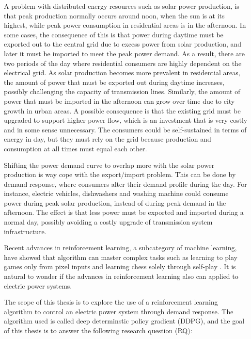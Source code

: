 \documentclass[class=book, crop=false]{standalone}
\begin{document}
A problem with distributed energy resources such as solar power production, is that peak production  normally occurs around noon, when the sun is at its highest, while peak power consumption in residential areas is in the afternoon. In some cases, the consequence of this is that power during daytime must be exported out to the central grid due to excess power from solar production, and later it must be imported to meet the peak power demand. As a result, there are two periods of the day where residential consumers are highly dependent on the electrical grid. As solar production becomes more prevalent in residential areas, the amount of power that must be exported out during daytime increases, possibly challenging the capacity of transmission lines. Similarly, the amount of power that must be imported in the afternoon can grow over time due to city growth in urban areas. A possible consequence is that the existing grid must be upgraded to support higher power flow, which is an investment that is very costly and in some sense unnecessary. The consumers could be self-sustained in terms of energy in day, but they must rely on the grid because production and consumption at all times must equal each other.

Shifting the power demand curve to overlap more with the solar power production is way cope with the export/import problem. This can be done by demand response, where consumers alter their demand profile during the day. For instance, electric vehicles, dishwashers and washing machine could consume power during peak solar production, instead of during peak demand in the afternoon. The effect is that less power must be exported and imported during a normal day, possibly avoiding a costly upgrade of transmission system infrastructure.

Recent advances in reinforcement learning, a subcategory of machine learning, have showed that algorithm can master complex tasks such as learning to play games only from pixel inputs and learning chess solely through self-play \cite{DQN_Mnih_et_al_2013}\cite{alphazero}. It is natural to wonder if the advances in reinforcement learning also can applied to electric power systems.

The scope of this thesis is to explore the use of a reinforcement learning algorithm to control an electric power system through demand response. The algorithm used is called deep determinstic policy gradient (DDPG), and the goal of this thesis is to answer the following research question (RQ):
\end{document}
